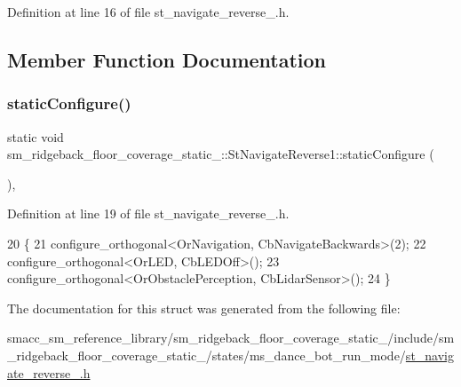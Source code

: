 Definition at line 16 of file st\+\_\+navigate\+\_\+reverse\+\_.\+h.



\subsection{Member Function Documentation}
\mbox{\label{structsm__ridgeback__floor__coverage__static__1_1_1StNavigateReverse1_a82ffadad5cd2112d6e79b54ca1344ec4}} 
\subsubsection{\texorpdfstring{static\+Configure()}{staticConfigure()}}
{\footnotesize\ttfamily static void sm\+\_\+ridgeback\+\_\+floor\+\_\+coverage\+\_\+static\+\_\+::\+St\+Navigate\+Reverse1\+::static\+Configure (\begin{DoxyParamCaption}{ }\end{DoxyParamCaption})\hspace{0.3cm}{\ttfamily [inline]}, {\ttfamily [static]}}



Definition at line 19 of file st\+\_\+navigate\+\_\+reverse\+\_.\+h.


\begin{DoxyCode}
20       \{
21          configure\_orthogonal<OrNavigation, CbNavigateBackwards>(2);
22          configure\_orthogonal<OrLED, CbLEDOff>();
23          configure\_orthogonal<OrObstaclePerception, CbLidarSensor>();
24       \}
\end{DoxyCode}


The documentation for this struct was generated from the following file\+:\begin{DoxyCompactItemize}
\item 
smacc\+\_\+sm\+\_\+reference\+\_\+library/sm\+\_\+ridgeback\+\_\+floor\+\_\+coverage\+\_\+static\+\_/include/sm\+\_\+ridgeback\+\_\+floor\+\_\+coverage\+\_\+static\+\_/states/ms\+\_\+dance\+\_\+bot\+\_\+run\+\_\+mode/\hyperlink{sm__ridgeback__floor__coverage__static__1_2include_2sm__ridgeback__floor__coverage__static__1_2s9309214bc00910592380341ef9918561}{st\+\_\+navigate\+\_\+reverse\+\_.\+h}\end{DoxyCompactItemize}

